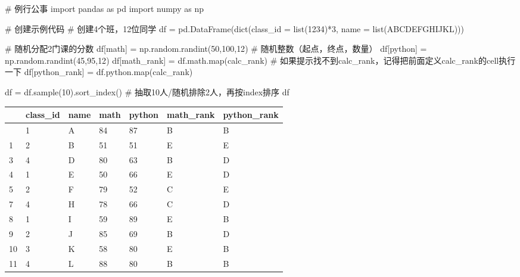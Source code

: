 \documentclass[
  letterpaper,
  DIV=11,
  numbers=noendperiod]{scrreprt}
\newenvironment{Shaded}{\begin{snugshade}}{\end{snugshade}}
\newcommand{\BuiltInTok}[1]{\textcolor[rgb]{0.00,0.23,0.31}{#1}}
\newcommand{\CommentTok}[1]{\textcolor[rgb]{0.37,0.37,0.37}{#1}}
\newcommand{\DecValTok}[1]{\textcolor[rgb]{0.68,0.00,0.00}{#1}}
\newcommand{\ImportTok}[1]{\textcolor[rgb]{0.00,0.46,0.62}{#1}}
\newcommand{\NormalTok}[1]{\textcolor[rgb]{0.00,0.23,0.31}{#1}}
\newcommand{\OperatorTok}[1]{\textcolor[rgb]{0.37,0.37,0.37}{#1}}
\newcommand{\StringTok}[1]{\textcolor[rgb]{0.13,0.47,0.30}{#1}}
\begin{document}
\begin{Shaded}
\begin{Highlighting}[]
\CommentTok{\# 例行公事}
\ImportTok{import}\NormalTok{ pandas }\ImportTok{as}\NormalTok{ pd}
\ImportTok{import}\NormalTok{ numpy }\ImportTok{as}\NormalTok{ np}

\CommentTok{\# 创建示例代码}
\CommentTok{\# 创建4个班，12位同学}
\NormalTok{df }\OperatorTok{=}\NormalTok{ pd.DataFrame(}\BuiltInTok{dict}\NormalTok{(class\_id }\OperatorTok{=} \BuiltInTok{list}\NormalTok{(}\StringTok{\textquotesingle{}1234\textquotesingle{}}\NormalTok{)}\OperatorTok{*}\DecValTok{3}\NormalTok{, name }\OperatorTok{=} \BuiltInTok{list}\NormalTok{(}\StringTok{\textquotesingle{}ABCDEFGHIJKL\textquotesingle{}}\NormalTok{)))}

\CommentTok{\# 随机分配2门课的分数}
\NormalTok{df[}\StringTok{\textquotesingle{}math\textquotesingle{}}\NormalTok{] }\OperatorTok{=}\NormalTok{ np.random.randint(}\DecValTok{50}\NormalTok{,}\DecValTok{100}\NormalTok{,}\DecValTok{12}\NormalTok{) }\CommentTok{\# 随机整数（起点，终点，数量）}
\NormalTok{df[}\StringTok{\textquotesingle{}python\textquotesingle{}}\NormalTok{] }\OperatorTok{=}\NormalTok{ np.random.randint(}\DecValTok{45}\NormalTok{,}\DecValTok{95}\NormalTok{,}\DecValTok{12}\NormalTok{)}
\NormalTok{df[}\StringTok{\textquotesingle{}math\_rank\textquotesingle{}}\NormalTok{] }\OperatorTok{=}\NormalTok{ df.math.}\BuiltInTok{map}\NormalTok{(calc\_rank) }\CommentTok{\# 如果提示找不到calc\_rank，记得把前面定义calc\_rank的cell执行一下}
\NormalTok{df[}\StringTok{\textquotesingle{}python\_rank\textquotesingle{}}\NormalTok{] }\OperatorTok{=}\NormalTok{ df.python.}\BuiltInTok{map}\NormalTok{(calc\_rank)}

\NormalTok{df }\OperatorTok{=}\NormalTok{ df.sample(}\DecValTok{10}\NormalTok{).sort\_index() }\CommentTok{\# 抽取10人/随机排除2人，再按index排序}
\NormalTok{df}
\end{Highlighting}
\end{Shaded}

\begin{longtable}[]{@{}lllllll@{}}
\toprule\noalign{}
& class\_id & name & math & python & math\_rank & python\_rank \\
\midrule\noalign{}
\endhead
\bottomrule\noalign{}
\endlastfoot
0 & 1 & A & 84 & 87 & B & B \\
1 & 2 & B & 51 & 51 & E & E \\
3 & 4 & D & 80 & 63 & B & D \\
4 & 1 & E & 50 & 66 & E & D \\
5 & 2 & F & 79 & 52 & C & E \\
7 & 4 & H & 78 & 66 & C & D \\
8 & 1 & I & 59 & 89 & E & B \\
9 & 2 & J & 85 & 69 & B & D \\
10 & 3 & K & 58 & 80 & E & B \\
11 & 4 & L & 88 & 80 & B & B \\
\end{longtable}
\end{document}

